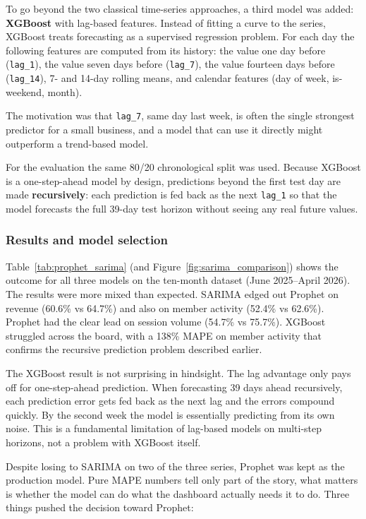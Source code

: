 \documentclass[12pt, a4paper]{report}
\begin{document}
To go beyond the two classical time-series approaches, a third model was added:
\textbf{XGBoost} with lag-based features. Instead of fitting a curve to the
series, XGBoost treats forecasting as a supervised regression problem. For each
day the following features are computed from its history: the value one day
before (\texttt{lag\_1}), the value seven days before (\texttt{lag\_7}), the
value fourteen days before (\texttt{lag\_14}), 7- and 14-day rolling means, and
calendar features (day of week, is-weekend, month).

The motivation was that \texttt{lag\_7}, same day last week, is often the
single strongest predictor for a small business, and a model that can use it
directly might outperform a trend-based model.

For the evaluation the same 80/20 chronological split was used. Because XGBoost
is a one-step-ahead model by design, predictions beyond the first test day are
made \textbf{recursively}: each prediction is fed back as the next
\texttt{lag\_1} so that the model forecasts the full 39-day test horizon without
seeing any real future values.

\subsubsection*{Results and model selection}

Table~\ref{tab:prophet_sarima} (and Figure~\ref{fig:sarima_comparison}) shows
the outcome for all three models on the ten-month dataset (June 2025--April 2026).
The results were more mixed than expected. SARIMA edged out Prophet on revenue
(60.6\% vs 64.7\%) and also on member activity (52.4\% vs 62.6\%). Prophet
had the clear lead on session volume (54.7\% vs 75.7\%). XGBoost struggled
across the board, with a 138\% MAPE on member activity that confirms the
recursive prediction problem described earlier.

The XGBoost result is not surprising in hindsight. The lag advantage only pays
off for one-step-ahead prediction. When forecasting 39 days ahead recursively,
each prediction error gets fed back as the next lag and the errors compound
quickly. By the second week the model is essentially predicting from its own
noise. This is a fundamental limitation of lag-based models on multi-step
horizons, not a problem with XGBoost itself.

Despite losing to SARIMA on two of the three series, Prophet was kept as the
production model. Pure MAPE numbers tell only part of the story, what matters
is whether the model can do what the dashboard actually needs it to do. Three
things pushed the decision toward Prophet:
\end{document}

